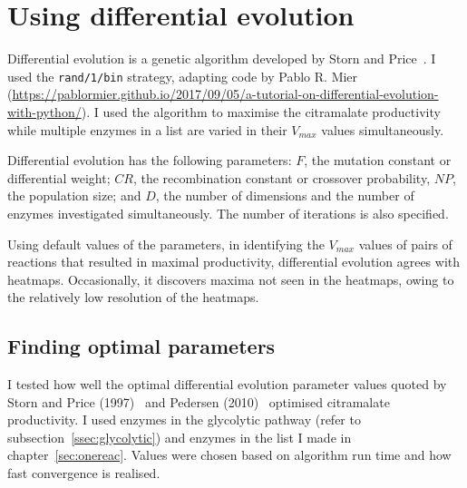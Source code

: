 \documentclass[parskip=full]{scrreprt}
\begin{document}
\section{Using differential evolution}
\label{sec:de}

Differential evolution is a genetic algorithm developed by Storn and Price~\cite{storn_differential_1997}. I used the \texttt{rand/1/bin} strategy, adapting code by Pablo R. Mier (\url{https://pablormier.github.io/2017/09/05/a-tutorial-on-differential-evolution-with-python/}). I used the algorithm to maximise the citramalate productivity while multiple enzymes in a list are varied in their $V_{max}$ values simultaneously.

Differential evolution has the following parameters: $F$, the mutation constant or differential weight; $CR$, the recombination constant or crossover probability, $NP$, the population size; and $D$, the number of dimensions and the number of enzymes investigated simultaneously. The number of iterations is also specified.

Using default values of the parameters, in identifying the $V_{max}$ values of pairs of reactions that resulted in maximal productivity, differential evolution agrees with heatmaps. Occasionally, it discovers maxima not seen in the heatmaps, owing to the relatively low resolution of the heatmaps.

\subsection{Finding optimal parameters}
\label{ssec:deoptimise}

I tested how well the optimal differential evolution parameter values quoted by Storn and Price (1997)~\cite{storn_differential_1997} and Pedersen (2010)~\cite{pedersen_good_2010} optimised citramalate productivity. I used enzymes in the glycolytic pathway (refer to subsection~\vref{ssec:glycolytic}) and enzymes in the list I made in chapter~\vref{sec:onereac}. Values were chosen based on algorithm run time and how fast convergence is realised.
\end{document}
